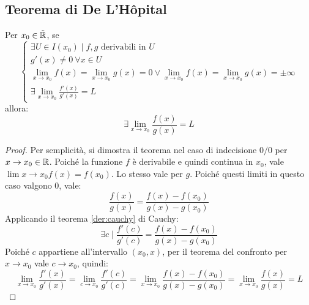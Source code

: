 \subsection{Teorema di De L'Hôpital}
\begin{teor}[di De L'Hôpital]
	\label{der:hopital}
	Per $x_0\in\tilde{\mathbb{R}}$, se
	\[
		\begin{cases}
			\exists U\in I(x_0)\mid f,g\text{ derivabili in }U                                                                               \\
			g'(x)\neq0~\forall x\in U                                                                                                        \\
			\lim_{x\to x_0}\limits f(x)=\lim_{x\to x_0}\limits g(x)=0\lor \lim_{x\to x_0}\limits f(x) =\lim_{x\to x_0}\limits g(x)=\pm\infty \\
			\exists \lim_{x\to x_0}\limits \frac{f'(x)}{g'(x)}=L
		\end{cases}
	\]
	allora:
	\[
		\exists\lim_{x\to x_0} \frac{f(x)}{g(x)}=L
	\]
\end{teor}
\begin{proof}
	Per semplicità, si dimostra il teorema nel caso di indecisione $0/0$ per $x\to x_0\in\mathbb{R}$. Poiché la funzione $f$ è derivabile e quindi continua in $x_0$, vale $\lim{x\to x_0}f(x)=f(x_0)$. Lo stesso vale per $g$. Poiché questi limiti in questo caso valgono $0$, vale:
	\[
		\frac{f(x)}{g(x)}=\frac{f(x)-f(x_0)}{g(x)-g(x_0)}
	\]
	Applicando il teorema \ref{der:cauchy} di Cauchy:
	\[
		\exists c\mid \frac{f'(c)}{g'(c)}=\frac{f(x)-f(x_0)}{g(x)-g(x_0)}
	\]
	Poiché $c$ appartiene all'intervallo $(x_0,x)$, per il teorema del confronto per $x\to x_0$ vale $c\to x_0$, quindi:
	\begin{equation*}
		\lim_{x\to x_0} \frac{f'(x)}{g'(x)}=\lim_{c\to x_0} \frac{f'(c)}{g'(c)}=\lim_{x\to x_0} \frac{f(x)-f(x_0)}{g(x)-g(x_0)}=\lim_{x\to x_0} \frac{f(x)}{g(x)}=L
	\end{equation*}
\end{proof}
